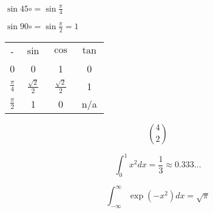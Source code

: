 \documentclass{article}
\begin{document}
$\sin 45\circ = \sin\frac{\pi}{4}$

$\sin 90\circ = \sin\frac{\pi}{2} = 1$

\begin{tabular}{c c c c}
-               & $\sin$               & $\cos$               & $\tan$\\
0               & 0                    & 1                    & 0\\
$\frac{\pi}{4}$ & $\frac{\sqrt{2}}{2}$ & $\frac{\sqrt{2}}{2}$ & 1\\
$\frac{\pi}{2}$ & 1                    & 0                    & n/a
\end{tabular}

$$\binom{4}{2}$$

$$\int_0^1x^2dx=\frac{1}{3}\approx0.333...$$

$$\int_{-\infty}^\infty\exp(-x^2)dx = \sqrt{\pi}$$
\end{document}

